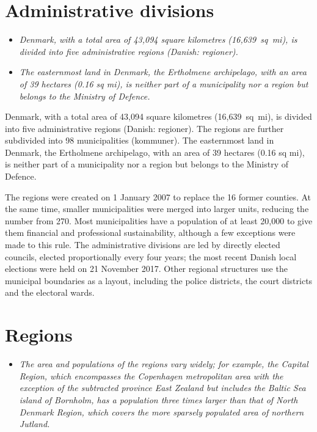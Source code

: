 \section{Administrative divisions}\label{administrative-divisions}

\begin{itemize}
\item
  \emph{Denmark, with a total area of 43,094 square kilometres
  (16,639~sq~mi), is divided into five administrative regions (Danish:
  regioner).}
\item
  \emph{The easternmost land in Denmark, the Ertholmene archipelago,
  with an area of 39 hectares (0.16 sq mi), is neither part of a
  municipality nor a region but belongs to the Ministry of Defence.}
\end{itemize}

Denmark, with a total area of 43,094 square kilometres (16,639~sq~mi),
is divided into five administrative regions (Danish: regioner). The
regions are further subdivided into 98 municipalities (kommuner). The
easternmost land in Denmark, the Ertholmene archipelago, with an area of
39 hectares (0.16 sq mi), is neither part of a municipality nor a region
but belongs to the Ministry of Defence.

The regions were created on 1 January 2007 to replace the 16 former
counties. At the same time, smaller municipalities were merged into
larger units, reducing the number from 270. Most municipalities have a
population of at least 20,000 to give them financial and professional
sustainability, although a few exceptions were made to this rule. The
administrative divisions are led by directly elected councils, elected
proportionally every four years; the most recent Danish local elections
were held on 21 November 2017. Other regional structures use the
municipal boundaries as a layout, including the police districts, the
court districts and the electoral wards.

\section{Regions}\label{regions}

\begin{itemize}
\item
  \emph{The area and populations of the regions vary widely; for
  example, the Capital Region, which encompasses the Copenhagen
  metropolitan area with the exception of the subtracted province East
  Zealand but includes the Baltic Sea island of Bornholm, has a
  population three times larger than that of North Denmark Region, which
  covers the more sparsely populated area of northern Jutland.}
\end{itemize}

